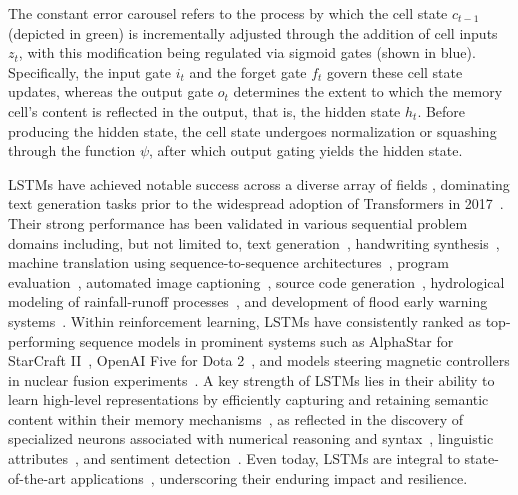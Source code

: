 The constant error carousel refers to the process by which the cell state $c_{t-1}$ (depicted in green) is incrementally adjusted through the addition of cell inputs $z_t$, with this modification being regulated via sigmoid gates (shown in blue). Specifically, the input gate $i_t$ and the forget gate $f_t$ govern these cell state updates, whereas the output gate $o_t$ determines the extent to which the memory cell’s content is reflected in the output, that is, the hidden state $h_t$. Before producing the hidden state, the cell state undergoes normalization or squashing through the function $\psi$, after which output gating yields the hidden state.

LSTMs have achieved notable success across a diverse array of fields \citep{Hochreiter:01,Hochreiter:07,Schmidhuber:15}, dominating text generation tasks prior to the widespread adoption of Transformers in 2017~\citep{Vaswani:17}. Their strong performance has been validated in various sequential problem domains including, but not limited to, text generation~\citep{Graves:13,Karpathy:15blog}, handwriting synthesis~\citep{Graves:13}, machine translation using sequence-to-sequence architectures~\citep{Sutskever:14nips}, program evaluation~\citep{Zaremba:14arxiv}, automated image captioning~\citep{Karpathy:15,Hossain:19}, source code generation~\citep{Karpathy:15blog}, hydrological modeling of rainfall-runoff processes~\citep{Kratzert:18,Kratzert:19}, and development of flood early warning systems~\citep{Nearing:24}. Within reinforcement learning, LSTMs have consistently ranked as top-performing sequence models in prominent systems such as AlphaStar for StarCraft II~\citep{Vinyals:17short}, OpenAI Five for Dota 2~\citep{OpenAI:19}, and models steering magnetic controllers in nuclear fusion experiments~\citep{Degrave:22short}. A key strength of LSTMs lies in their ability to learn high-level representations by efficiently capturing and retaining semantic content within their memory mechanisms~\citep{Karpathy:15blog}, as reflected in the discovery of specialized neurons associated with numerical reasoning and syntax~\citep{Lakretz:19}, linguistic attributes~\citep{Bau:19}, and sentiment detection~\citep{Radford:17arxiv}. Even today, LSTMs are integral to state-of-the-art applications~\citep{Degrave:22short,Nearing:24}, underscoring their enduring impact and resilience.

